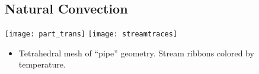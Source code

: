 \subsection*{Natural Convection}
\begin{frame}[t]
  \begin{center}
    \texttt{[image: part\_trans]}
    \texttt{[image: streamtraces]}
  \end{center}
  \begin{block}{}
    \begin{itemize}
    \item{
      Tetrahedral mesh of ``pipe'' geometry.
      Stream ribbons colored by temperature.
      }
      \end{itemize}
  \end{block}
\end{frame}
